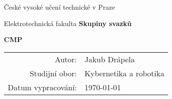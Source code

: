 \documentclass[11pt,a4paper]{article}
\author{Jakub Drápela}
\begin{document}
\pagestyle{empty}


	\begin{center}

\large

České vysoké učení technické v Praze

\medskip

Elektrotechnická fakulta
\vfill
\vfill
{\LARGE\bfseries Skupiny svazků}


\vspace{15mm}

\vfill
\vfill
\vfill

{\LARGE\bfseries CMP}

\vfill

\begin{tabular}{rl}

Autor: & Jakub Drápela \\
\noalign{\vspace{2mm}}
Studijní obor: & Kybernetika a robotika \\
\noalign{\vspace{2mm}}
Datum vypracování: & \today\\
\end{tabular}

\end{center}

\newpage
\pagestyle{plain}     %
\setcounter{page}{1}  %


\clearpage
\nocite{*}
\printbibliography 
\end{document}
